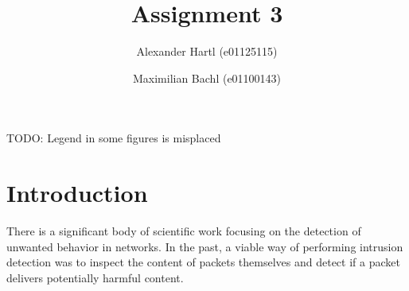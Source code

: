 \documentclass[sigconf,nonacm]{acmart}
\newcommand\note[2]{{\color{#1}#2}}
\newcommand\todo[1]{{\note{red}{TODO: #1}}}
\begin{document}
\title{Assignment 3}

\author{Alexander Hartl (e01125115)}

\author{Maximilian Bachl (e01100143)}
\authornotemark[1]

\renewcommand{\shortauthors}{Hartl and Bachl}


\maketitle

\todo{Legend in some figures is misplaced}

\section{Introduction}

There is a significant body of scientific work focusing on the detection of unwanted behavior in networks. In the past, a viable way of performing intrusion detection was to inspect the content of packets themselves and detect if a packet delivers potentially harmful content.
\end{document}
